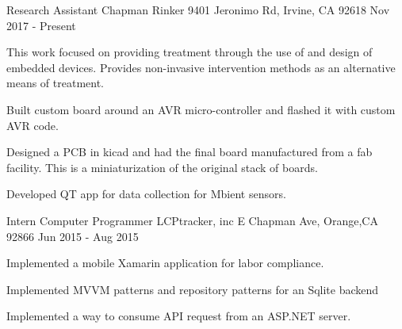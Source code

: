 

\begin{cventries}

  \cventry
    {Research Assistant} %
    {Chapman Rinker} %
    {9401 Jeronimo Rd, Irvine, CA 92618} %
    {Nov 2017 - Present} %
    {
      \begin{cvitems} %
        \item{This work focused on providing treatment through the use of and design of embedded devices. Provides non-invasive intervention methods as an alternative means of treatment.}
        \item {Built custom board around an AVR micro-controller and flashed it with custom AVR code.}
        \item {Designed a PCB in kicad and had the final board manufactured from a fab facility. This is a miniaturization of the original stack of boards.}
        \item {Developed QT app for data collection for Mbient sensors.}
      \end{cvitems}
    }

  \cventry
    {Intern Computer Programmer} %
    {LCPtracker, inc} %
    {E Chapman Ave, Orange,CA 92866} %
    {Jun 2015 - Aug 2015} %
    {
      \begin{cvitems} %
        \item{Implemented a mobile Xamarin application for labor compliance.}
        \item {Implemented MVVM patterns and repository patterns for an Sqlite backend}
        \item {Implemented a way to consume API request from an ASP.NET server.}
      \end{cvitems}
    }


\end{cventries}
